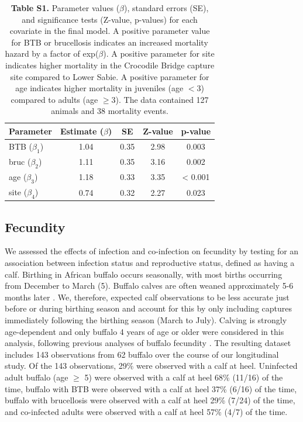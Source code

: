 \documentclass[10pt,letterpaper]{article}
\begin{document}
\begin{table}[hb]
\centering
\caption*{\textbf{Table S1.} Parameter values ($\beta$), standard errors (SE), and significance tests (Z-value, p-values) for each covariate in the final model. A positive parameter value for BTB or brucellosis indicates an increased mortality hazard by a factor of exp($\beta$). A positive parameter for site indicates higher mortality in the Crocodile Bridge capture site compared to Lower Sabie. A positive parameter for age indicates higher mortality in juveniles (age $<3$) compared to adults (age $\geq 3$).  The data contained 127 animals and 38 mortality events.}
\newcommand{\head}[1]{\textnormal{\textbf{#1}}}
\normalsize
\begin{tabular}{lcccc} 
\hline
\head{Parameter     } & \head{     Estimate ($\beta$)     } & \head{     SE     } & \head{     Z-value     } & \head{     p-value     } \\*
\hline
BTB ($\beta_1$) & 1.04 & 0.35 & 2.98 & 0.003 \\
bruc ($\beta_2$)  & 1.11 & 0.35 & 3.16 & 0.002\\
age ($\beta_3$) & 1.18 & 0.33 & 3.35 & < 0.001\\
site ($\beta_4$) & 0.74 & 0.32 & 2.27 & 0.023\\
\hline 
\end{tabular}
\end{table} 
 
\pagebreak 

\subsection*{Fecundity}
We assessed the effects of infection and co-infection on fecundity by testing for an association between infection status and reproductive status, defined as having a calf. Birthing in African buffalo occurs seasonally, with most births occurring from December to March (5). Buffalo calves are often weaned approximately 5-6 months later \cite{winthrop_bovine_1988}. 
We, therefore, expected calf observations to be less accurate just before or during birthing season and account for this by only including captures immediately following the birthing season (March to July). Calving is strongly age-dependent and only buffalo 4 years of age or older were considered in this analysis, following previous analyses of buffalo fecundity \cite{gorsich_context-dependent_2015}. 
The resulting dataset includes 143 observations from 62 buffalo over the course of our longitudinal study. 
Of the 143 observations, 29\% were observed with a calf at heel. 
Uninfected adult buffalo (age $\geq$ 5) were observed with a calf at heel 68\% (11/16) of the time, buffalo with BTB were observed with a calf at heel 37\% (6/16) of the time, buffalo with brucellosis were observed with a calf at heel 29\% (7/24) of the time, and co-infected adults were observed with a calf at heel 57\% (4/7) of the time.
\end{document}
